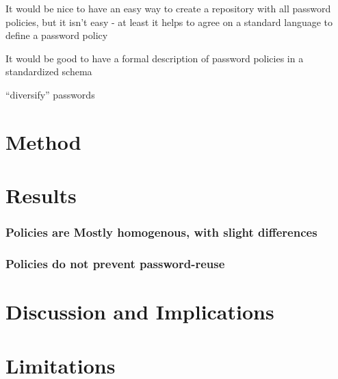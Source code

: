 	It would be nice to have an easy way to create a repository with all password policies, but it isn't easy - at least it helps to agree on a standard language to define a password policy \cite{Steves2015PasswordPolicyLanguage}

It would be good to have a formal description of password policies in a standardized schema \cite{Horsch2016PasswordPolicyMarkup}

``diversify'' passwords \cite{Segreti2017AdaptivePolicies}

\cite{Habib2017Blacklists}

\section{Method}

\section{Results}
\subsubsection{Policies are Mostly homogenous, with slight differences}
\subsubsection{Policies do not prevent password-reuse}

\section{Discussion and Implications}

\section{Limitations}
